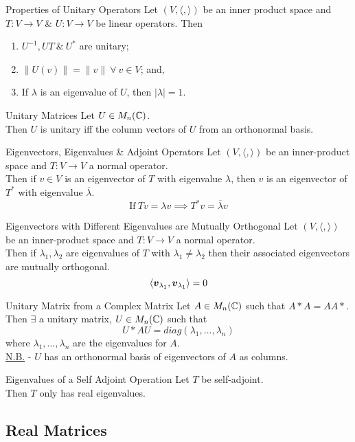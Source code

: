 \documentclass[11pt,a4paper]{article}
\begin{document}
\subtitle{Theorem 10.09 - }{Properties of Unitary Operators}
Let $(V, \langle,\rangle)$ be an inner product space and $T : V \to V$ \& $U : V \to V$ be linear operators. Then
\begin{enumerate}[label=\roman*)]
  \item $U^{-1}, UT\ \&\ U^*$ are unitary;
  \item $\|U(v)\| = \|v\|\ \forall\ v \in V$; and,
  \item If $\lambda$ is an eigenvalue of $U$, then $|\lambda| = 1$.
\end{enumerate}

\subtitle{Theorem 10.10 - }{Unitary Matrices}
Let $U \in M_n(\mathbb{C})$.\\
Then $U$ is unitary iff the column vectors of $U$ from an orthonormal basis.\\

\subtitle{Theorem 10.11 - }{Eigenvectors, Eigenvalues \& Adjoint Operators}
Let $(V, \langle,\rangle)$ be an inner-product space and $T : V \to V$ a normal operator.\\
Then if $v \in V$ is an eigenvector of $T$ with eigenvalue $\lambda$, then $v$ is an eigenvector of $T^*$ with eigenvalue $\overline{\lambda}$.
$$\mathrm{If\ }Tv = \lambda v \implies T^*v = \overline{\lambda}v$$

\subtitle{Theorem 10.12 - }{Eigenvectors with Different Eigenvalues are Mutually Orthogonal}
Let $(V, \langle,\rangle)$ be an inner-product space and $T : V \to V$ a normal operator.\\
Then if $\lambda_1, \lambda_2$ are eigenvalues of $T$ with $\lambda_1 \neq \lambda_2$ then their associated eigenvectors are mutually orthogonal.
$$\langle \boldsymbol{v}_{\lambda_1}, \boldsymbol{v}_{\lambda_1} \rangle = 0$$

\subtitle{Theorem 10.13 - }{Unitary Matrix from a Complex Matrix}
Let $A \in M_n(\mathbb{C})$ such that $A*A = AA*$.\\
Then $\exists$ a unitary matrix, $U \in M_n(\mathbb{C})$ such that
$$U*AU=diag(\lambda_1, \dots , \lambda_n)$$
where $\lambda_1, \dots, \lambda_n$ are the eigenvalues for $A$.\\
\underline{N.B.} - $U$ has an orthonormal basis of eigenvectors of $A$ as columns.\\

\subtitle{Theorem 10.14 - }{Eigenvalues of a Self Adjoint Operation}
Let $T$ be self-adjoint.\\
Then $T$ only has real eigenvalues.

\subsection{Real Matrices}
\end{document}
